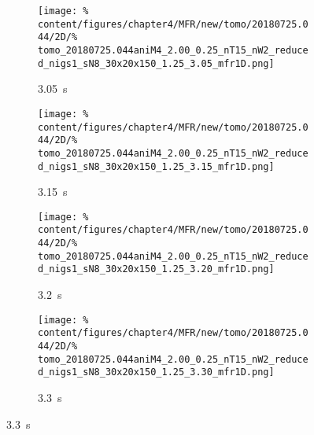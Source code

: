             \begin{figure}[t]%
                \centering%
                \begin{subfigure}{0.475\textwidth}%
                    \centering%
                    \caption{\SI{3.05}{\second}}%
                    \vspace*{-0.1cm}%
                    \texttt{[image: \%
                        content/figures/chapter4/MFR/new/tomo/20180725.044/2D/\%
                        tomo\_20180725.044aniM4\_2.00\_0.25\_nT15\_nW2\_reduced\_nigs1\_sN8\_30x20x150\_1.25\_3.05\_mfr1D.png]}%
                \end{subfigure}%
                \hfill%
                \begin{subfigure}{0.475\textwidth}%
                    \centering%
                    \caption{\SI{3.15}{\second}}%
                    \vspace*{-0.1cm}%
                    \texttt{[image: \%
                        content/figures/chapter4/MFR/new/tomo/20180725.044/2D/\%
                        tomo\_20180725.044aniM4\_2.00\_0.25\_nT15\_nW2\_reduced\_nigs1\_sN8\_30x20x150\_1.25\_3.15\_mfr1D.png]}%
                \end{subfigure}%
                \newline%
                \vspace*{-0.1cm}%
                \begin{subfigure}{0.475\textwidth}%
                    \centering%
                    \caption{\SI{3.2}{\second}}%
                    \vspace*{-0.1cm}%
                    \texttt{[image: \%
                        content/figures/chapter4/MFR/new/tomo/20180725.044/2D/\%
                        tomo\_20180725.044aniM4\_2.00\_0.25\_nT15\_nW2\_reduced\_nigs1\_sN8\_30x20x150\_1.25\_3.20\_mfr1D.png]}%
                \end{subfigure}%
                \hfill%
                \vspace*{-0.1cm}%
                \begin{subfigure}{0.475\textwidth}%
                    \centering%
                    \caption{\SI{3.3}{\second}}%
                    \vspace*{-0.1cm}%
                    \texttt{[image: \%
                        content/figures/chapter4/MFR/new/tomo/20180725.044/2D/\%
                        tomo\_20180725.044aniM4\_2.00\_0.25\_nT15\_nW2\_reduced\_nigs1\_sN8\_30x20x150\_1.25\_3.30\_mfr1D.png]}%
                \end{subfigure}%

\end{figure}
